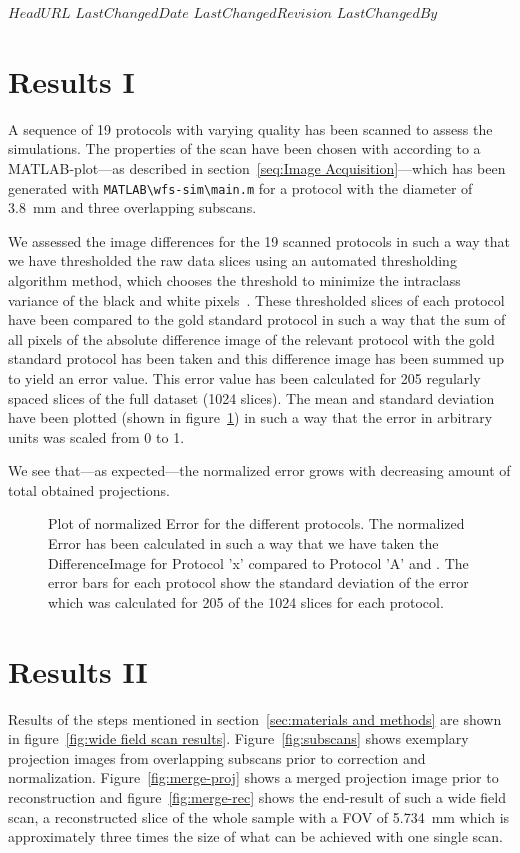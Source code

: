 \svnidlong
{$HeadURL$}
{$LastChangedDate$}
{$LastChangedRevision$}
{$LastChangedBy$}
\section{Results I}
\label{sec: Results I}
A sequence of 19 protocols with varying quality has been scanned to assess the simulations. The properties of the scan have been chosen with according to a MATLAB-plot---as described in section~\ref{seq:Image Acquisition}---which has been generated with \verb+MATLAB\wfs-sim\main.m+ for a protocol with the diameter of \SI{3.8}{mm} and three overlapping subscans.

We assessed the image differences for the 19 scanned protocols in such a way that we have thresholded the raw data slices using an automated thresholding algorithm method, which chooses the threshold to minimize the intraclass variance of the black and white pixels~\cite{Otsu1979}. These thresholded slices of each protocol have been compared to the gold standard protocol in such a way that the sum of all pixels of the absolute difference image of the relevant protocol with the gold standard protocol has been taken and this difference image has been summed up to yield an error value. This error value has been calculated for 205 regularly spaced slices of the full dataset (1024 slices). The mean and standard deviation have been plotted (shown in figure~\ref{fig:NormalizedErrorPlot}) in such a way that the error in arbitrary units was scaled from 0 to 1.

We see that---as expected---the normalized error grows with decreasing amount of total obtained projections.

\begin{figure}
	\centering
		
	\caption{Plot of normalized Error for the different protocols. The normalized Error has been calculated in such a way that we have taken the DifferenceImage for Protocol 'x' compared to Protocol 'A' and . The error bars for each protocol show the standard deviation of the error which was calculated for 205 of the 1024 slices for each protocol.}
	\label{fig:NormalizedErrorPlot}
\end{figure}


\section{Results II}
Results of the steps mentioned in section~\ref{sec:materials and methods} are shown in figure~\ref{fig:wide field scan results}. Figure~\ref{fig:subscans} shows exemplary projection images from overlapping subscans prior to correction and normalization. Figure~\ref{fig:merge-proj} shows a merged projection image prior to reconstruction and figure~\ref{fig:merge-rec} shows the end-result of such a wide field scan, a reconstructed slice of the whole sample with a FOV of \SI{5.734}{\milli\meter} which is  approximately three times the size of what can be achieved with one single scan.

